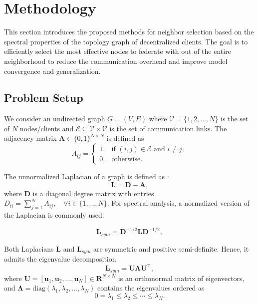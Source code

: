 \documentclass[journal]{IEEEtran}
\begin{document}
\section{Methodology}
\label{sec:methodology}

This section introduces the proposed methods for neighbor selection based on the spectral properties of the topology graph of decentralized clients. The goal is to efficiently select the most effective nodes to federate with out of the entire neighborhood to reduce the communication overhead and improve model convergence and generalization.

\subsection{Problem Setup} 
We consider an undirected  graph $G=(V,E)$ where $\mathcal{V} = \{1,2,\dots,N\}$ is the set of $N$ nodes/clients and $\mathcal{E} \subseteq \mathcal{V} \times \mathcal{V}$ is the set of communication links. The adjacency matrix $\mathbf{A} \in \{0,1\}^{N \times N}$ is defined as
\begin{equation}
    A_{ij} =
        \begin{cases}
            1, & \text{if } (i,j) \in \mathcal{E} \text{ and } i \neq j, \\
            0, & \text{otherwise.}
        \end{cases}
\end{equation}

The unnormalized Laplacian of a graph is defined as \cite{graph_theory}:
\begin{equation}
    \mathbf{L} = \mathbf{D} - \mathbf{A},
\end{equation}
where $\mathbf{D}$ is a diagonal degree matrix with entries $D_{ii} = \sum_{j=1}^N A_{ij}, \quad \forall i \in \{1, \dots, N\}$. For spectral analysis, a normalized version of the Laplacian is commonly used:

\begin{equation}
    \mathbf{L}_{sym} = \mathbf{D}^{-1/2}\mathbf{L}\mathbf{D}^{-1/2},
\end{equation}

Both Laplacians $\mathbf{L}$ and $\mathbf{L}_{sym}$ are symmetric and positive semi-definite. 
Hence, it admits the eigenvalue decomposition
\begin{equation}    
\mathbf{L}_{sym} = \mathbf{U} \mathbf{\Lambda} \mathbf{U}^\top,
\end{equation}
where $\mathbf{U} = [\mathbf{u}_1, \mathbf{u}_2, \dots, \mathbf{u}_N] \in \mathbf{R}^{N \times N}$ is an orthonormal matrix of eigenvectors, 
and $\mathbf{\Lambda} = \mathrm{diag}(\lambda_1, \lambda_2, \dots, \lambda_N)$ contains the eigenvalues 
ordered as
\begin{equation}
0 = \lambda_1 \leq \lambda_2 \leq \cdots \leq \lambda_N.
\end{equation}
\end{document}
